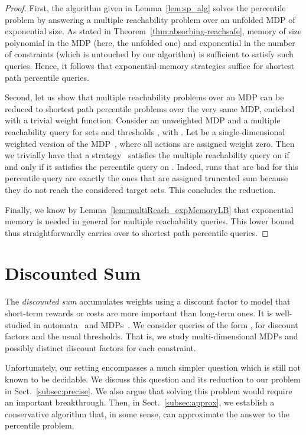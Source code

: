 \documentclass{llncs}
\begin{document}
\begin{proof}
First, the algorithm given in Lemma~\ref{lem:sp_alg} solves the percentile problem by answering a multiple reachability problem over an unfolded MDP of exponential size. As stated in Theorem~\ref{thm:absorbing-reachsafe}, memory of size polynomial in the MDP (here, the unfolded one) and exponential in the number of constraints (which is untouched by our algorithm) is sufficient to satisfy such queries. Hence, it follows that exponential-memory strategies suffice for shortest path percentile queries.

Second, let us show that multiple reachability problems over an MDP  can be reduced to shortest path percentile problems over the very same MDP, enriched with a trivial weight function. Consider an unweighted MDP  and a multiple reachability query for sets  and thresholds , with . Let  be a single-dimensional weighted version of the MDP~, where all actions are assigned weight zero. Then we trivially have that a strategy~ satisfies the multiple reachability query on  if and only if it satisfies the percentile query  on . Indeed, runs that are bad for this percentile query are exactly the ones that are assigned truncated sum  because they do not reach the considered target sets. This concludes the reduction.

Finally, we know by Lemma~\ref{lem:multiReach_expMemoryLB} that exponential memory is needed in general for multiple reachability queries. This lower bound thus straightforwardly carries over to shortest path percentile queries.
\end{proof} 
\section{Discounted Sum}
\label{sec:ds}

The \textit{discounted sum} accumulates weights using a discount factor to model that short-term rewards or costs are more important than long-term ones. It is well-studied in automata~\cite{DBLP:journals/corr/BokerH14} and MDPs~\cite{Puterman-wiley94,CMH-stacs06,DBLP:conf/lpar/ChatterjeeFW13}. We consider queries of the form , for discount factors  and the usual thresholds. That is, we study multi-dimensional MDPs and possibly distinct discount factors for each constraint.
	
Unfortunately, our setting encompasses a much simpler question which is still not known to be decidable. We discuss this question and its reduction to our problem in Sect.~\ref{subsec:precise}. We also argue that solving this problem would require an important breakthrough. Then, in Sect.~\ref{subsec:approx}, we establish a conservative algorithm that, in some sense, can approximate the answer to the percentile problem.
	
\end{document}
